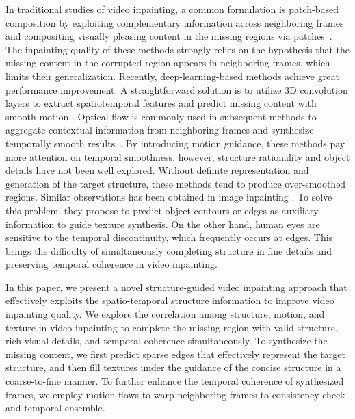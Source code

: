 In traditional studies of video inpainting, a common formulation is patch-based composition by exploiting complementary information across neighboring frames and compositing visually pleasing content in the missing regions via patches~\cite{patwardhan2007video,wexler2004space,newson2014video}.
% 
The inpainting quality of these methods strongly relies on the hypothesis that the missing content in the corrupted region appears in neighboring frames, which limits their generalization.
%
Recently, deep-learning-based methods achieve great performance improvement.
A straightforward solution is to utilize 3D convolution layers to extract spatiotemporal features and predict missing content with smooth motion \cite{wang2019video}.
Optical flow is commonly used in subsequent methods to aggregate contextual information from neighboring frames and synthesize temporally smooth results~\cite{Xu_2019_CVPR,Kim_2019_CVPR,Kim_2019_CVPR1}.
%
By introducing motion guidance, these methods pay more attention on temporal smoothness, however, structure rationality and object details have not been well explored. 
%
Without definite representation and generation of the target structure, these methods tend to produce over-smoothed regions. 
Similar observations has been obtained in image inpainting \cite{Xiong_2019_CVPR,nazeri2019edgeconnect}. %
To solve this problem, they propose to predict object contours or edges as auxiliary information to guide texture synthesis.
%
On the other hand, human eyes are sensitive to the temporal discontinuity, which frequently occurs at edges. 
This brings the difficulty of simultaneously completing structure in fine details and preserving temporal coherence in video inpainting.
 

In this paper, we present a novel structure-guided video inpainting approach that effectively exploits the spatio-temporal structure information to improve video inpainting quality.  
We explore the correlation among structure, motion, and texture in video inpainting to complete the missing region with valid structure, rich visual details, and temporal coherence simultaneously.
%
To synthesize the missing content, we first predict sparse edges that effectively represent the target structure, and then fill textures under the guidance of the concise structure in a coarse-to-fine manner.
To further enhance the temporal coherence of synthesized frames, we employ motion flows to warp neighboring frames to consistency check and temporal ensemble. 



